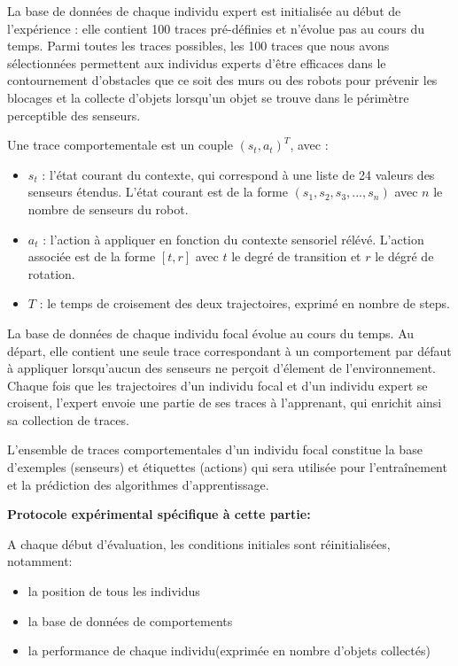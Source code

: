 \documentclass[a4paper, 12pt]{report}
\begin{document}
	La base de données de chaque individu expert est initialisée au début de l'expérience : elle contient 100 traces pré-définies et n'évolue pas au cours du temps. Parmi toutes les traces possibles, les 100 traces que nous avons sélectionnées permettent aux individus experts d'être efficaces dans le contournement d'obstacles que ce soit des murs ou des robots pour prévenir les blocages et la collecte d'objets lorsqu'un objet se trouve dans le périmètre perceptible des senseurs.
	
	Une trace comportementale est un couple $( s_t, a_t )^T$, avec :
	\begin{itemize}
	\item $s_t$ : l'état courant du contexte, qui correspond à une liste de 24 valeurs des senseurs étendus. L'état courant est de la forme 
    $(s_1, s_2, s_3, ..., s_n)$ avec $n$ le nombre de senseurs du robot. 
	\item $a_t$ : l'action à appliquer en fonction du contexte sensoriel rélévé. L'action associée est de la forme $[t,r]$ avec $t$ le degré de transition et $r$ le dégré de rotation.
	\item $T$ : le temps de croisement des deux trajectoires, exprimé en nombre de steps. 
	\end{itemize}


	La base de données de chaque individu focal évolue au cours du temps. Au départ, elle contient une seule trace correspondant à un comportement par défaut à appliquer lorsqu'aucun des senseurs ne perçoit d'élement de l'environnement. Chaque fois que les trajectoires d'un individu focal et d'un individu expert se croisent, l'expert envoie une partie de ses traces à l'apprenant, qui enrichit ainsi sa collection de traces.
	
    L'ensemble de traces comportementales d'un individu focal constitue la base d'exemples (senseurs) et étiquettes (actions) qui sera utilisée pour l'entraînement et la prédiction des algorithmes d'apprentissage.
    
    \:
    
    \textbf{Protocole expérimental spécifique à cette partie:} 
    
    A chaque début d'évaluation, les conditions initiales sont réinitialisées, notamment:
    \begin{itemize}
	\item la position de tous les individus
    \item la base de données de comportements
    \item la performance de chaque individu(exprimée en nombre d'objets collectés)
	\end{itemize}
    
\end{document}
